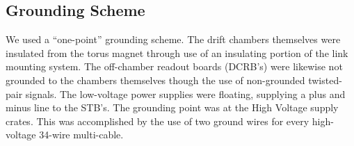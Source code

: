 \subsection{Grounding Scheme}
We used a ``one-point'' grounding scheme.  The drift chambers themselves were insulated
from the torus magnet through use of an insulating portion of the link
mounting system.  The off-chamber readout boards (DCRB's) were likewise not grounded
to the chambers themselves though the use of non-grounded twisted-pair signals.
The low-voltage power supplies were floating, supplying a plus and minus line 
to the STB's.
The grounding point was at the High Voltage supply crates.  This was accomplished
by the use of two ground wires for every high-voltage 34-wire multi-cable.
